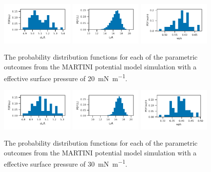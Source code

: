 \documentclass[amsmath,amssymb,superscriptaddress]{revtex4-1}
\begin{document}
%
%
\begin{figure}
 \centering
 \includegraphics[width=0.32\textwidth]{martini_20_dh}
 \includegraphics[width=0.32\textwidth]{martini_20_tt}
 \includegraphics[width=0.32\textwidth]{martini_20_wph}
 \caption{The probability distribution functions for each of the parametric outcomes from the MARTINI potential model simulation with a effective surface pressure of \SI{20}{\milli\newton\per\meter}.}
 \label{fig:ma20}
\end{figure}
%
%
\begin{figure}
 \centering
 \includegraphics[width=0.32\textwidth]{martini_30_dh}
 \includegraphics[width=0.32\textwidth]{martini_30_tt}
 \includegraphics[width=0.32\textwidth]{martini_30_wph}
 \caption{The probability distribution functions for each of the parametric outcomes from the MARTINI potential model simulation with a effective surface pressure of \SI{30}{\milli\newton\per\meter}.}
 \label{fig:ma30}
\end{figure}
\end{document}
